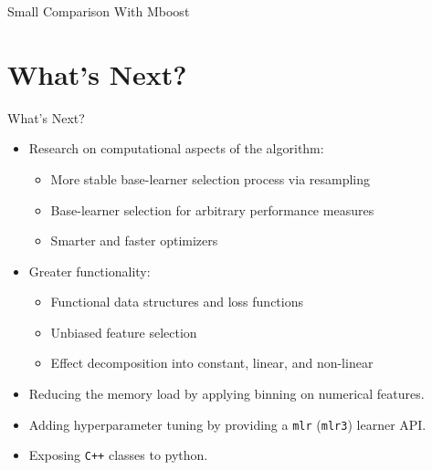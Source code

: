 \documentclass[10pt]{beamer}\usepackage[]{graphicx}\usepackage[]{color}
\begin{document}
\begin{frame}{Small Comparison With Mboost}
\end{frame}


\section{What's Next?}

\begin{frame}{What's Next?}

\begin{itemize}
  \item
    Research on computational aspects of the algorithm:
    \begin{itemize}
      \item
        More stable base-learner selection process via resampling
      \item
        Base-learner selection for arbitrary performance measures
      \item
        Smarter and faster optimizers
    \end{itemize}

  \item
    Greater functionality:
    \begin{itemize}
      \item
        Functional data structures and loss functions
      \item
        Unbiased feature selection
      \item
        Effect decomposition into constant, linear, and non-linear
    \end{itemize}

    \item
      Reducing the memory load by applying binning on numerical features.

    \item
      Adding hyperparameter tuning by providing a \texttt{mlr} (\texttt{mlr3}) learner API.

    \item
      Exposing \texttt{C++} classes to python.
\end{itemize}

\end{frame}

\addtocounter{framenumber}{-1}
\end{document}
